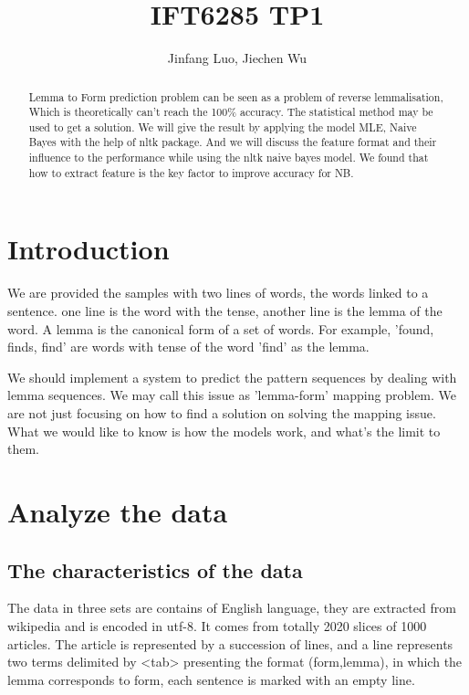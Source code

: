 \documentclass[a4paper]{article}
\title{IFT6285 TP1}
\author{Jinfang Luo, Jiechen Wu}
\begin{document}
\maketitle

\begin{abstract}
Lemma to Form prediction problem can be seen as a problem of reverse lemmalisation, Which is theoretically can't reach the 100\% accuracy. The statistical method may be used to get a solution. We will give the result by applying the model MLE, Naive Bayes with the help of nltk package. And we will discuss the feature format and their influence to the performance while using the nltk naive bayes model. We found that how to extract feature is the key factor to improve accuracy for NB.
\end{abstract}

\section{Introduction}
We are provided the samples with two lines of words, the words linked to a sentence. one line is the word with the tense, another line is the lemma of the word. A lemma is the canonical form of a set of words. For example, 'found, finds, find' are words with tense of the word 'find' as the lemma.

We should implement a system to predict the pattern sequences by dealing with lemma sequences. We may call this issue as 'lemma-form' mapping problem. We are not just focusing on how to find a solution on solving the mapping issue. What we would like to know is how the models work, and what's the limit to them.  

\section{Analyze the data}

\subsection{The characteristics of the data}
The data in three sets are contains of English language, they are extracted from wikipedia and is encoded in utf-8. It comes from totally 2020 slices of 1000 articles. The article is represented by a succession of lines, and a line represents two terms delimited by <tab> presenting the format (form,lemma), in which the lemma corresponds to form, each sentence is marked with an empty line. 
\end{document}

